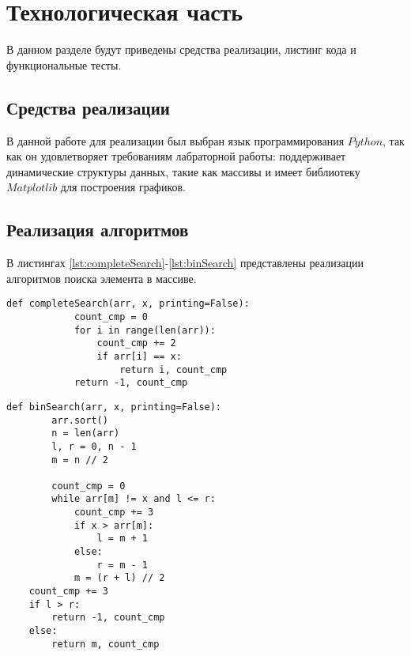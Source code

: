 \chapter{Технологическая часть}
В данном разделе будут приведены средства реализации, листинг кода и функциональные тесты.

\section{Средства реализации}
В данной работе для реализации был выбран язык программирования $Python$\cite{python-city}, так как он удовлетворяет требованиям лабраторной работы: поддерживает динамические структуры данных,
такие как массивы и имеет библиотеку $Matplotlib$\cite{matplotlib-lib} для построения графиков.


\section{Реализация алгоритмов}
В листингах \ref{lst:completeSearch}-\ref{lst:binSearch} представлены реализации алгоритмов поиска элемента в массиве.

\begin{center}
	\captionsetup{justification=raggedright,singlelinecheck=off}
	\renewcommand{\lstlistingname}{Листинг}
	\begin{lstlisting}[label=lst:completeSearch,caption=Алгоритм поиска элемента в массиве полным перебором]
		def completeSearch(arr, x, printing=False):
			count_cmp = 0
			for i in range(len(arr)):
				count_cmp += 2
				if arr[i] == x:
					return i, count_cmp
			return -1, count_cmp
	\end{lstlisting}
\end{center}

\begin{center}
	\captionsetup{justification=raggedright,singlelinecheck=off}
	\renewcommand{\lstlistingname}{Листинг}
	\begin{lstlisting}[label=lst:binSearch, caption=Алгоритма поиска элемента в массиве бинарным поиском]
	def binSearch(arr, x, printing=False):
		arr.sort()
		n = len(arr)
		l, r = 0, n - 1
		m = n // 2
		
		count_cmp = 0
		while arr[m] != x and l <= r:
			count_cmp += 3
			if x > arr[m]:
				l = m + 1
			else:
				r = m - 1
			m = (r + l) // 2
	count_cmp += 3
	if l > r:
		return -1, count_cmp
	else:
		return m, count_cmp
	\end{lstlisting}
\end{center}

